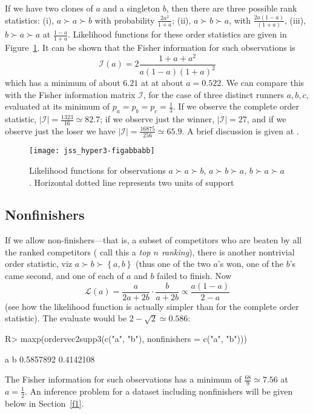 \documentclass[article]{jss}
\begin{document}
If we have two clones of $a$ and a singleton $b$, then there are three
possible rank statistics: (i), $a\succ a\succ b$ with probability
$\frac{2a^2}{1+a}$; (ii), $a\succ b\succ a$, with
$\frac{2a(1-a)}{(1+a)}$, (iii), $b\succ a\succ a$ at
$\frac{1-a}{1+a}$.  Likelihood functions for these order statistics
are given in Figure~\ref{ABAetc_likelihood}.  It can be shown that the
Fisher information for such observations is
%
\begin{equation}
\mathcal{I}(a)=2\frac{1+a+a^2}{a(1-a)(1+a)^2}
\end{equation}
%
which has a minimum of about $6.21$ at at about $a=0.522$.  We can
compare this with the Fisher information matrix ${\mathcal I}$, for
the case of three distinct runners $a,b,c$, evaluated at its minimum
of $p_a=p_b=p_c=\frac{1}{3}$.  If we observe the complete order
statistic, $\left|{\mathcal I}\right| =\frac{1323}{16}\simeq 82.7$; if
we observe just the winner, $\left|{\mathcal I}\right|=27$, and if we
observe just the loser we have $\left|{\mathcal
I}\right|=\frac{16875}{256}\simeq 65.9$.  A brief discussion is given
at .

\begin{figure}[t!]
\centering
\texttt{[image: jss\_hyper3-figabbabb]}
\caption{Likelihood \label{ABAetc_likelihood} functions for
observations $a\succ a\succ b$, $a\succ b\succ a$, $b\succ a\succ a$.  Horizontal dotted
line represents two units of support}
\end{figure}

\subsection{Nonfinishers}

If we allow non-finishers---that is, a subset of competitors who are
beaten by all the ranked competitors (\cite{turner2020} call this a
{\em top $n$ ranking}), there is another nontrivial order statistic,
viz $a\succ b\succ\left\lbrace a,b\right\rbrace$ (thus one of the two
  $a$'s won, one of the $b$'s came second, and one of each of $a$ and
  $b$ failed to finish.  Now
%
\begin{equation}
\mathcal{L}(a)=
\frac{a}{2a+2b}\cdot
\frac{b}{ a+2b}\propto\frac{a(1-a)}{2-a}
\end{equation}
%
(see how the likelihood function is actually simpler than for the
complete order statistic).  The evaluate would be $2-\sqrt{2}\simeq
0.586$:
%
\begin{Schunk}
\begin{Sinput}
R> maxp(ordervec2supp3(c("a", "b"), nonfinishers = c("a", "b")))
\end{Sinput}
\begin{Soutput}
        a         b 
0.5857892 0.4142108 
\end{Soutput}
\end{Schunk}
%
The Fisher information for such observations has a minimum of
$\frac{68}{9}\simeq 7.56$ at $a=\frac{1}{2}$.  An inference problem
for a dataset including nonfinishers will be given below in
Section~\ref{f1}.
\end{document}
